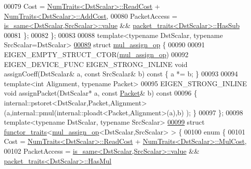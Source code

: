 \begin{DoxyCode}
00079     Cost = \hyperlink{group___core___module_struct_eigen_1_1_num_traits}{NumTraits<DstScalar>::ReadCost} + 
      \hyperlink{group___core___module_struct_eigen_1_1_num_traits}{NumTraits<DstScalar>::AddCost},
00080     PacketAccess = \hyperlink{struct_eigen_1_1internal_1_1is__same}{is\_same<DstScalar,SrcScalar>::value} && 
      \hyperlink{struct_eigen_1_1internal_1_1packet__traits}{packet\_traits<DstScalar>::HasSub}
00081   \};
00082 \};
00083 
00088 \textcolor{keyword}{template}<\textcolor{keyword}{typename} DstScalar, \textcolor{keyword}{typename} SrcScalar=DstScalar>
\hyperlink{struct_eigen_1_1internal_1_1mul__assign__op}{00089} \textcolor{keyword}{struct }\hyperlink{struct_eigen_1_1internal_1_1mul__assign__op}{mul\_assign\_op} \{
00090 
00091   EIGEN\_EMPTY\_STRUCT\_CTOR(\hyperlink{struct_eigen_1_1internal_1_1mul__assign__op}{mul\_assign\_op})
00092   EIGEN\_DEVICE\_FUNC EIGEN\_STRONG\_INLINE \textcolor{keywordtype}{void} assignCoeff(DstScalar& a, \textcolor{keyword}{const} SrcScalar& b)\textcolor{keyword}{ const }\{ a *= b; 
      \}
00093   
00094   \textcolor{keyword}{template}<\textcolor{keywordtype}{int} Alignment, \textcolor{keyword}{typename} Packet>
00095   EIGEN\_STRONG\_INLINE \textcolor{keywordtype}{void} assignPacket(DstScalar* a, \textcolor{keyword}{const} \hyperlink{union_eigen_1_1internal_1_1_packet}{Packet}& b)\textcolor{keyword}{ const}
00096 \textcolor{keyword}{  }\{ internal::pstoret<DstScalar,Packet,Alignment>(a,internal::pmul(internal::ploadt<Packet,Alignment>(a),b)
      ); \}
00097 \};
00098 \textcolor{keyword}{template}<\textcolor{keyword}{typename} DstScalar, \textcolor{keyword}{typename} SrcScalar>
\hyperlink{struct_eigen_1_1internal_1_1functor__traits_3_01mul__assign__op_3_01_dst_scalar_00_01_src_scalar_01_4_01_4}{00099} \textcolor{keyword}{struct }\hyperlink{struct_eigen_1_1internal_1_1functor__traits}{functor\_traits}<\hyperlink{struct_eigen_1_1internal_1_1mul__assign__op}{mul\_assign\_op}<DstScalar,SrcScalar> > \{
00100   \textcolor{keyword}{enum} \{
00101     Cost = \hyperlink{group___core___module_struct_eigen_1_1_num_traits}{NumTraits<DstScalar>::ReadCost} + 
      \hyperlink{group___core___module_struct_eigen_1_1_num_traits}{NumTraits<DstScalar>::MulCost},
00102     PacketAccess = \hyperlink{struct_eigen_1_1internal_1_1is__same}{is\_same<DstScalar,SrcScalar>::value} && 
      \hyperlink{struct_eigen_1_1internal_1_1packet__traits}{packet\_traits<DstScalar>::HasMul}

\end{DoxyCode}
